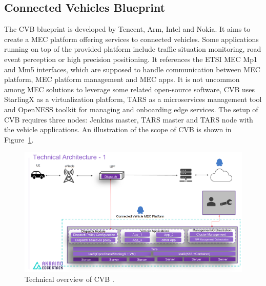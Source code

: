 \documentclass[12pt,a4paper,twoside]{report}
\begin{document}
\subsection{Connected Vehicles Blueprint}
The CVB blueprint is developed by Tencent, Arm, Intel and Nokia. It aims to create a MEC platform offering services to connected vehicles. Some applications running on top of the provided platform include traffic situation monitoring, road event perception or high precision positioning. It references the ETSI MEC Mp1 and Mm5 interfaces, which are supposed to handle communication between MEC platform, MEC platform management and MEC apps. It is not uncommon among MEC solutions to leverage some related open-source software, CVB uses StarlingX as a virtualization platform, TARS as a microservices management tool and OpenNESS toolkit for managing and onboarding edge services. The setup of CVB requires three nodes: Jenkins master, TARS master and TARS node with the vehicle applications. An illustration of the scope of CVB is shown in Figure~\ref{F:cvb}. \cite{cvb-docu} 
\begin{figure}[ht]
	\centering
	\includegraphics[width=\textwidth]{./images/akraino-cvb.png}
	\caption{Technical overview of CVB \cite{cvb-docu}.}
	\label{F:cvb}
\end{figure}
\end{document}
